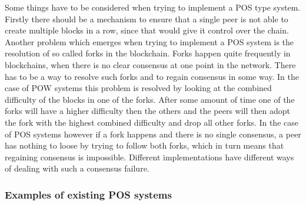 Some things have to be considered when trying to implement a POS type system. Firstly there should be a mechanism to ensure that a single peer is not able to create multiple blocks in a row, since
that would give it control over the chain. Another problem which emerges when trying to implement a POS system is the resolution of so called forks in the blockchain. Forks happen
quite frequently in blockchains, when there is no clear consensus at one point in the network. There has to be a way to resolve such forks and to regain consensus in some way. 
In the case of POW systems this problem is resolved by looking at the combined difficulty of the blocks in one of the forks.
After some amount of time one of the forks will have a higher difficulty
then the others and the peers will then adopt the fork with the highest combined difficulty and drop all other forks.\cite{url:bitcoin}
In the case of POS systems however if a fork happens and there is no single consensus, a peer has nothing to loose by trying to follow both forks, which in turn means that regaining
consensus is impossible. Different implementations have different ways of dealing with such a consensus failure.\cite{url:pos_impossible}

\subsubsection{Examples of existing POS systems}

